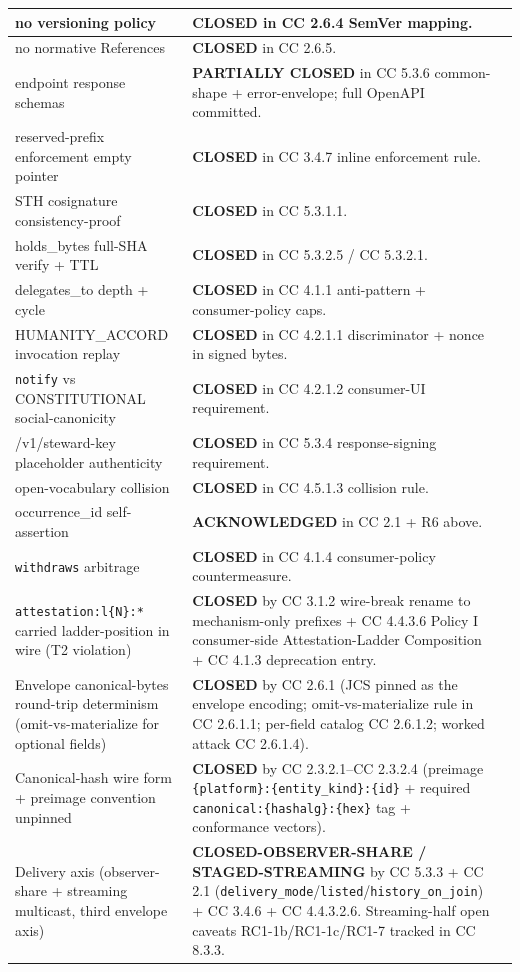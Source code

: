 \documentclass[11pt]{article}
\begin{document}
{\begin{longtable}{|p{5.33cm}|p{5.33cm}|p{5.33cm}|}
no versioning policy & \textbf{CLOSED} in CC 2.6.4 SemVer mapping. &  \\ \hline
no normative References & \textbf{CLOSED} in CC 2.6.5. &  \\ \hline
endpoint response schemas & \textbf{PARTIALLY CLOSED} in CC 5.3.6 common-shape + error-envelope; full OpenAPI committed. &  \\ \hline
reserved-prefix enforcement empty pointer & \textbf{CLOSED} in CC 3.4.7 inline enforcement rule. &  \\ \hline
STH cosignature consistency-proof & \textbf{CLOSED} in CC 5.3.1.1. &  \\ \hline
holds\_bytes full-SHA verify + TTL & \textbf{CLOSED} in CC 5.3.2.5 / CC 5.3.2.1. &  \\ \hline
delegates\_to depth + cycle & \textbf{CLOSED} in CC 4.1.1 anti-pattern + consumer-policy caps. &  \\ \hline
HUMANITY\_ACCORD invocation replay & \textbf{CLOSED} in CC 4.2.1.1 discriminator + nonce in signed bytes. &  \\ \hline
\texttt{notify} vs CONSTITUTIONAL social-canonicity & \textbf{CLOSED} in CC 4.2.1.2 consumer-UI requirement. &  \\ \hline
/v1/steward-key placeholder authenticity & \textbf{CLOSED} in CC 5.3.4 response-signing requirement. &  \\ \hline
open-vocabulary collision & \textbf{CLOSED} in CC 4.5.1.3 collision rule. &  \\ \hline
occurrence\_id self-assertion & \textbf{ACKNOWLEDGED} in CC 2.1 + R6 above. &  \\ \hline
\texttt{withdraws} arbitrage & \textbf{CLOSED} in CC 4.1.4 consumer-policy countermeasure. &  \\ \hline
\texttt{attestation:l\{N\}:*} carried ladder-position in wire (T2 violation) & \textbf{CLOSED} by CC 3.1.2 wire-break rename to mechanism-only prefixes + CC 4.4.3.6 Policy I consumer-side Attestation-Ladder Composition + CC 4.1.3 deprecation entry. &  \\ \hline
Envelope canonical-bytes round-trip determinism (omit-vs-materialize for optional fields) & \textbf{CLOSED} by CC 2.6.1 (JCS pinned as the envelope encoding; omit-vs-materialize rule in CC 2.6.1.1; per-field catalog CC 2.6.1.2; worked attack CC 2.6.1.4). &  \\ \hline
Canonical-hash wire form + preimage convention unpinned & \textbf{CLOSED} by CC 2.3.2.1–CC 2.3.2.4 (preimage \texttt{\{platform\}:\{entity\_kind\}:\{id\}} + required \texttt{canonical:\{hashalg\}:\{hex\}} tag + conformance vectors). &  \\ \hline
Delivery axis (observer-share + streaming multicast, third envelope axis) & \textbf{CLOSED-OBSERVER-SHARE / STAGED-STREAMING} by CC 5.3.3 + CC 2.1 (\texttt{delivery\_mode}/\texttt{listed}/\texttt{history\_on\_join}) + CC 3.4.6 + CC 4.4.3.2.6. Streaming-half open caveats RC1-1b/RC1-1c/RC1-7 tracked in CC 8.3.3. &  \\ \hline
\end{longtable}}
\end{document}
